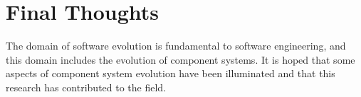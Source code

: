 


\section{Final Thoughts}
The domain of software evolution is fundamental to software engineering, and this domain includes the evolution of component systems.
It is hoped that some aspects of component system evolution have been illuminated and that this research has contributed to the field. 

 
